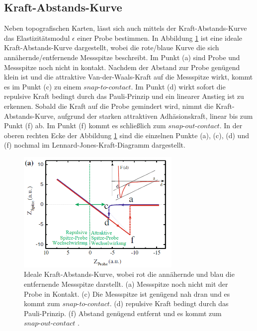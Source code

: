 \subsection{Kraft-Abstands-Kurve}
\label{sec:Kraft-Abstand}

Neben topografischen Karten, lässt sich auch mittels der Kraft-Abstands-Kurve das
Elastizitätsmodul $\epsilon$ einer Probe bestimmen. In Abbildung \ref{fig:Kraft-Abstand}
ist eine ideale Kraft-Abstands-Kurve dargestellt, wobei die rote/blaue Kurve die
sich annähernde/entfernende Messspitze beschreibt. Im Punkt (a) sind Probe und
Messspitze noch nicht in kontakt. Nachdem der Abstand zur Probe genügend klein
ist und die attraktive Van-der-Waals-Kraft auf die Messspitze wirkt, kommt es im
Punkt (c) zu einem $\textit{snap-to-contact}$. Im Punkt (d) wirkt sofort die repulsive
Kraft bedingt durch das Pauli-Prinzip und ein linearer Anstieg ist zu erkennen.
Sobald die Kraft auf die Probe gemindert wird, nimmt die Kraft-Abstands-Kurve,
aufgrund der starken attraktiven Adhäsionskraft, linear bis zum Punkt (f) ab.
Im Punkt (f) kommt es schließlich zum $\textit{snap-out-contact}$. In der oberen
rechten Ecke der Abbildung \ref{fig:Kraft-Abstand} sind die einzelnen Punkte (a),
(c), (d) und (f) nochmal im Lennard-Jones-Kraft-Diagramm dargestellt.

\begin{figure}[H]
	\centering
	\includegraphics[width=0.7\textwidth]{Abb/Kraft-Abstands-Kurve.png}
	\caption{Ideale Kraft-Abstands-Kurve, wobei rot die annähernde und blau die
	entfernende Messspitze darstellt. (a) Messspitze noch nicht mit der Probe in
	Kontakt. (c) Die Messspitze ist genügend nah dran und es kommt zum
$\textit{snap-to-contact}$. (d) repulsive Kraft bedingt durch das Pauli-Prinzip.
	(f) Abstand genügend entfernt und es kommt zum $\textit{snap-out-contact}$
	\cite[184]{AFM}.}
	\label{fig:Kraft-Abstand}
\end{figure}
